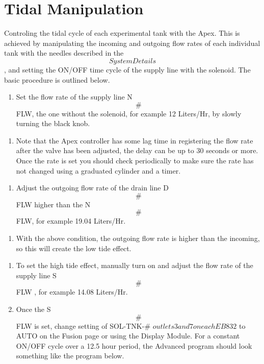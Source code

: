 \documentclass[]{book}
\providecommand{\tightlist}{%
  \setlength{\itemsep}{0pt}\setlength{\parskip}{0pt}}
\begin{document}
\chapter{Tidal Manipulation}\label{tidal-manipulation}

Controling the tidal cycle of each experimental tank with the Apex. This
is achieved by manipulating the incoming and outgoing flow rates of each
individual tank with the needles described in the \[System Details\],
and setting the ON/OFF time cycle of the supply line with the solenoid.
The basic procedure is outlined below.

\begin{enumerate}
\def\labelenumi{\arabic{enumi}.}
\tightlist
\item
  Set the flow rate of the supply line N\[\#\]FLW, the one without the
  solenoid, for example 12 Liters/Hr, by slowly turning the black knob.
\end{enumerate}

\begin{enumerate}
\def\labelenumi{\alph{enumi}.}
\tightlist
\item
  Note that the Apex controller has some lag time in registering the
  flow rate after the valve has been adjusted, the delay can be up to 30
  seconds or more. Once the rate is set you should check periodically to
  make sure the rate has not changed using a graduated cylinder and a
  timer.
\end{enumerate}

\begin{enumerate}
\def\labelenumi{\arabic{enumi}.}
\setcounter{enumi}{1}
\tightlist
\item
  Adjust the outgoing flow rate of the drain line D\[\#\]FLW higher than
  the N\[\#\]FLW, for example 19.04 Liters/Hr.
\end{enumerate}

\begin{enumerate}
\def\labelenumi{\alph{enumi}.}
\tightlist
\item
  With the above condition, the outgoing flow rate is higher than the
  incoming, so this will create the low tide effect.
\end{enumerate}

\begin{enumerate}
\def\labelenumi{\arabic{enumi}.}
\setcounter{enumi}{2}
\tightlist
\item
  To set the high tide effect, manually turn on and adjust the flow rate
  of the supply line S\[\#\]FLW , for example 14.08 Liters/Hr.\\
\item
  Once the S\[\#\]FLW is set, change setting of SOL-TNK-\#
  \(outlets 3 and 7 on each EB832\) to AUTO on the Fusion page or using
  the Display Module. For a constant ON/OFF cycle over a 12.5 hour
  period, the Advanced program should look something like the program
  below.
\end{enumerate}
\end{document}
